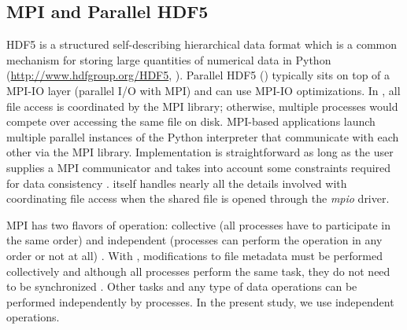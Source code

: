 \subsection{MPI and Parallel HDF5}
\label{sec:methods-hdf5}

HDF5 is a structured self-describing hierarchical data format which is a common mechanism for storing large quantities of numerical data in Python (\url{http://www.hdfgroup.org/HDF5}, \cite{pythonhdf5}).
Parallel HDF5 () typically sits on top of a MPI-IO layer (parallel I/O with MPI) and can use MPI-IO optimizations. 
In , all file access is coordinated by the MPI library; otherwise, multiple processes would compete over accessing the same file on disk. 
MPI-based applications launch multiple parallel instances of the Python interpreter that communicate with each other via the MPI library. 
Implementation is straightforward as long as the user supplies a MPI communicator and takes into account some constraints required for data consistency \cite{pythonhdf5}.
 itself handles nearly all the details involved with coordinating file access when the shared file is opened through the \emph{mpio} driver.

MPI has two flavors of operation: collective (all processes have to participate in the same order) and independent (processes can perform the operation in any order or not at all) \cite{pythonhdf5}.
With , modifications to file metadata must be performed collectively and although all processes perform the same task, they do not need to be synchronized \cite{pythonhdf5}. 
Other tasks and any type of data operations can be performed independently by processes.
In the present study, we use independent operations.

